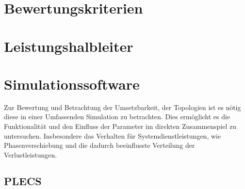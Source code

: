 \section{Bewertungskriterien}

\section{Leistungshalbleiter}

\section{Simulationssoftware}
Zur Bewertung und Betrachtung der Umsetzbarkeit, der Topologien ist es nötig diese in einer Umfassenden Simulation zu betrachten. Dies ermöglicht es die Funktionalität und den Einfluss der Parameter im direkten Zusammenspiel zu untersuchen. Insbesondere das Verhalten für Systemdienstleistungen, wie Phasenverschiebung und die dadurch beeinflusste Verteilung der Verlustleistungen. 
	\subsection{PLECS}